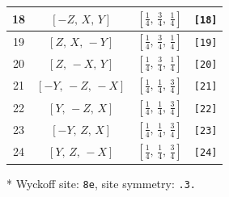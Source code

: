 \documentclass[fleqn,8pt]{jsarticle}
\begin{document}
\begin{longtable}{cccc}
18 & $\left[ - Z,\, X,\, Y \right]$ & $\left[ \frac{1}{4},\, \frac{3}{4},\, \frac{1}{4} \right]$ & {\tt [18]} \\ \hline
19 & $\left[ Z,\, X,\, - Y \right]$ & $\left[ \frac{1}{4},\, \frac{3}{4},\, \frac{1}{4} \right]$ & {\tt [19]} \\ \hline
20 & $\left[ Z,\, - X,\, Y \right]$ & $\left[ \frac{1}{4},\, \frac{3}{4},\, \frac{1}{4} \right]$ & {\tt [20]} \\ \hline
21 & $\left[ - Y,\, - Z,\, - X \right]$ & $\left[ \frac{1}{4},\, \frac{1}{4},\, \frac{3}{4} \right]$ & {\tt [21]} \\ \hline
22 & $\left[ Y,\, - Z,\, X \right]$ & $\left[ \frac{1}{4},\, \frac{1}{4},\, \frac{3}{4} \right]$ & {\tt [22]} \\ \hline
23 & $\left[ - Y,\, Z,\, X \right]$ & $\left[ \frac{1}{4},\, \frac{1}{4},\, \frac{3}{4} \right]$ & {\tt [23]} \\ \hline
24 & $\left[ Y,\, Z,\, - X \right]$ & $\left[ \frac{1}{4},\, \frac{1}{4},\, \frac{3}{4} \right]$ & {\tt [24]} \\
\end{longtable}
* Wyckoff site: {\tt 8e}, site symmetry: {\tt .3.}
\renewcommand{\arraystretch}{1.2}
\end{document}
